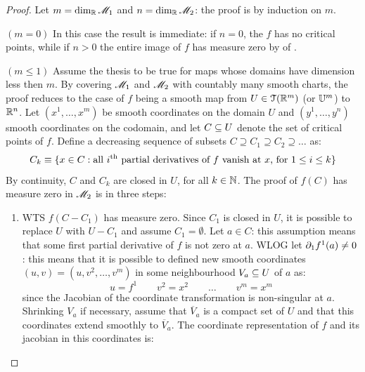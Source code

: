 \begin{proofbox}
  \begin{proof}
    Let $ m = \dim_{\mathbb{R}} \mathscr{M}_1 $ and $ n = \dim_{\mathbb{R}} \mathscr{M}_2 $: the proof is by induction on $ m $.

    $ (m = 0) $ In this case the result is immediate: if $ n = 0 $, the $ f $ has no critical points, while if $ n > 0 $ the entire image of $ f $ has measure zero by  of .

    $ (m \leq 1) $ Assume the thesis to be true for maps whose domains have dimension less then $ m $. By covering $ \mathscr{M}_1 $ and $ \mathscr{M}_2 $ with countably many smooth charts, the proof reduces to the case of $ f $ being a smooth map from $ U \in \EuScript{T}(\mathbb{R}^m) $ (or $ \mathbb{U}^m $) to $ \mathbb{R}^n $. Let $ (x^1 , \dots , x^m) $ be smooth coordinates on the domain $ U $ and $ (y^1 , \dots , y^n) $ smooth coordinates on the codomain, and let $ C \subseteq U $ denote the set of critical points of $ f $. Define a decreasing sequence of subsets $ C \supseteq C_1 \supseteq C_2 \supseteq \dots $ as:
    \begin{equation*}
      C_k \equiv \{ x \in C : \text{all $ i^\text{th} $ partial derivatives of $ f $ vanish at $ x $, for $ 1 \leq i \leq k $} \}
    \end{equation*}
    By continuity, $ C $ and $ C_k $ are closed in $ U $, for all $ k \in \mathbb{N} $. The proof of $ f(C) $ has measure zero in $ \mathscr{M}_2 $ is in three steps:
    \begin{enumerate}
      \item WTS $ f(C - C_1) $ has measure zero. Since $ C_1 $ is closed in $ U $, it is possible to replace $ U $ with $ U - C_1 $ and assume $ C_1 = \emptyset $. Let $ a \in C $: this assumption means that some first partial derivative of $ f $ is not zero at $ a $. WLOG let $ \partial_1 f^1(a) \neq 0 $: this means that it is possible to defined new smooth coordinates $ (u,v) = (u,v^2 , \dots , v^m) $ in some neighbourhood $ V_a \subseteq U $ of $ a $ as:
        \begin{equation*}
          u = f^1
          \qquad
          v^2 = x^2
          \qquad
          \dots
          \qquad
          v^m = x^m
        \end{equation*}
        since the Jacobian of the coordinate transformation is non-singular at $ a $. Shrinking $ V_a $ if necessary, assume that $ \overline{V}_a $ is a compact set of $ U $ and that this coordinates extend smoothly to $ \overline{V}_a $. The coordinate representation of $ f $ and its jacobian in this coordinates is:

\end{enumerate}
\end{proof}
\end{proofbox}
